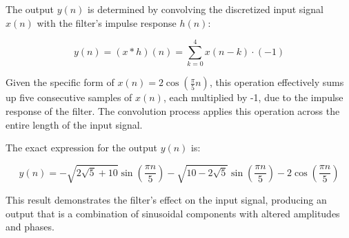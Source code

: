 \documentclass{article}
\begin{document}
The output \(y(n)\) is determined by convolving the discretized input signal \(x(n)\) with the filter's impulse response \(h(n)\):

\[y(n) = (x * h)(n) = \sum_{k=0}^{4} x(n-k) \cdot (-1)\]

Given the specific form of \(x(n) = 2\cos\left(\frac{\pi}{5}n\right)\), this operation effectively sums up five consecutive samples of \(x(n)\), each multiplied by -1, due to the impulse response of the filter. The convolution process applies this operation across the entire length of the input signal.

The exact expression for the output \(y(n)\) is:

\[y(n) = -\sqrt{2\sqrt{5} + 10}\sin\left(\frac{\pi n}{5}\right) - \sqrt{10 - 2\sqrt{5}}\sin\left(\frac{\pi n}{5}\right) - 2\cos\left(\frac{\pi n}{5}\right)\]

This result demonstrates the filter's effect on the input signal, producing an output that is a combination of sinusoidal components with altered amplitudes and phases.
\end{document}

